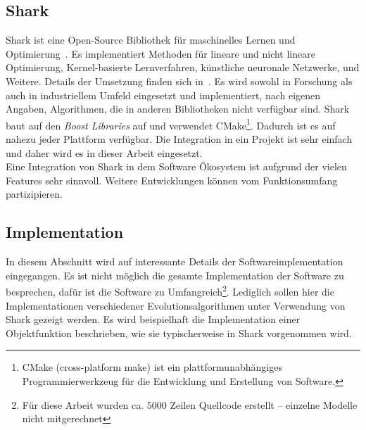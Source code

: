 %
\lstset{
	basicstyle=\scriptsize,
	language=C++,
	breaklines=true,
	frame=tbrl,
	breakatwhitespace=false
	breaklines=true,  
	xleftmargin=1cm,
	tabsize=2,
	showstringspaces=false}
%
\subsection{Shark}
\label{sec:Shark}
Shark ist eine Open-Source \cpp Bibliothek für maschinelles Lernen und Optimierung~\cite{Shark:1}. Es implementiert Methoden für lineare und nicht lineare Optimierung, Kernel-basierte Lernverfahren, künstliche neuronale Netzwerke, und Weitere. Details der Umsetzung finden sich in~\cite{shark08}. Es wird sowohl in Forschung als auch in industriellem Umfeld eingesetzt und implementiert, nach eigenen Angaben, Algorithmen, die in anderen Bibliotheken nicht verfügbar sind. Shark baut auf den \textit{Boost \cpp Libraries} auf und verwendet CMake\footnote{CMake (cross-platform make) ist ein plattformunabhängiges Programmierwerkzeug für die Entwicklung und Erstellung von Software.}. Dadurch ist es auf nahezu jeder Plattform verfügbar. Die Integration in ein Projekt ist sehr einfach und daher wird es in dieser Arbeit eingesetzt.\\

Eine Integration von Shark in dem Software Ökosystem ist aufgrund der vielen Features sehr sinnvoll. Weitere Entwicklungen können vom Funktionsumfang partizipieren.

%
\subsection{Implementation}
\label{sec:Implementation}
In diesem Abschnitt wird auf interessante Details der Softwareimplementation eingegangen. Es ist nicht möglich die gesamte Implementation der Software zu besprechen, dafür ist die Software zu Umfangreich\footnote{Für diese Arbeit wurden ca. $5000$ Zeilen Quellcode erstellt -- einzelne Modelle nicht mitgerechnet}. Lediglich sollen hier die Implementationen verschiedener Evolutionsalgorithmen unter Verwendung von Shark gezeigt werden. 
Es wird beispielhaft die Implementation einer Objektfunktion beschrieben, wie sie typischerweise in Shark vorgenommen wird.
%
%
%
